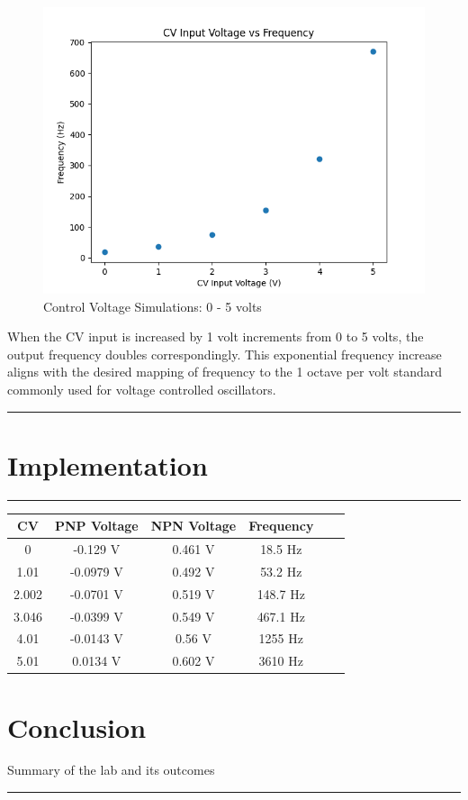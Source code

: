\documentclass{article}
\begin{document}
\begin{figure}[H]
  \centering
  \includegraphics[width=.7\linewidth]{png/Figure_3.png}
  \caption{Control Voltage Simulations: 0 - 5 volts}
\end{figure}

When the CV input is increased by 1 volt increments from 0 to 5 volts, the output frequency doubles correspondingly. This exponential frequency increase aligns with the desired mapping of frequency to the 1 octave per volt standard commonly used for voltage controlled oscillators.

\vspace{5mm}
\hrule

\section*{\textcolor{mycolor}{Implementation}}
\vspace{5mm}
\hrule

\begin{center}
  \begin{tabular}{cccccc}
  \textbf{CV} & \textbf{PNP Voltage} & \textbf{NPN Voltage} & \textbf{Frequency} \\
  \hline
  0             & -0.129 V                    & 0.461 V                  & 18.5 Hz                 \\
  1.01          & -0.0979 V                    & 0.492 V                  & 53.2 Hz                 \\
  2.002         & -0.0701 V                   & 0.519 V                  & 148.7 Hz                 \\
  3.046         & -0.0399 V                   & 0.549 V                  & 467.1 Hz                 \\
  4.01          & -0.0143 V                   & 0.56 V                  & 1255 Hz                   \\
  5.01          & 0.0134 V                   & 0.602 V                  & 3610 Hz                  \\
  \end{tabular}
\end{center}

  
  

\section*{\textcolor{mycolor}{Conclusion}}
Summary of the lab and its outcomes
\vspace{5mm}
\hrule
\end{document}
